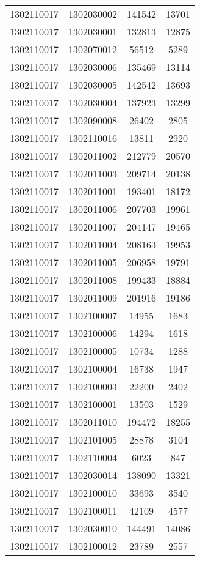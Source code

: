 \begin{longtable}[h]{llcc}
		1302110017 & 1302030002 & 141542 & 13701\\
		1302110017 & 1302030001 & 132813 & 12875\\
		1302110017 & 1302070012 & 56512 & 5289\\
		1302110017 & 1302030006 & 135469 & 13114\\
		1302110017 & 1302030005 & 142542 & 13693\\
		1302110017 & 1302030004 & 137923 & 13299\\
		1302110017 & 1302090008 & 26402 & 2805\\
		1302110017 & 1302110016 & 13811 & 2920\\
		1302110017 & 1302011002 & 212779 & 20570\\
		1302110017 & 1302011003 & 209714 & 20138\\
		1302110017 & 1302011001 & 193401 & 18172\\
		1302110017 & 1302011006 & 207703 & 19961\\
		1302110017 & 1302011007 & 204147 & 19465\\
		1302110017 & 1302011004 & 208163 & 19953\\
		1302110017 & 1302011005 & 206958 & 19791\\
		1302110017 & 1302011008 & 199433 & 18884\\
		1302110017 & 1302011009 & 201916 & 19186\\
		1302110017 & 1302100007 & 14955 & 1683\\
		1302110017 & 1302100006 & 14294 & 1618\\
		1302110017 & 1302100005 & 10734 & 1288\\
		1302110017 & 1302100004 & 16738 & 1947\\
		1302110017 & 1302100003 & 22200 & 2402\\
		1302110017 & 1302100001 & 13503 & 1529\\
		1302110017 & 1302011010 & 194472 & 18255\\
		1302110017 & 1302101005 & 28878 & 3104\\
		1302110017 & 1302110004 & 6023 & 847\\
		1302110017 & 1302030014 & 138090 & 13321\\
		1302110017 & 1302100010 & 33693 & 3540\\
		1302110017 & 1302100011 & 42109 & 4577\\
		1302110017 & 1302030010 & 144491 & 14086\\
		1302110017 & 1302100012 & 23789 & 2557\\

\end{longtable}
